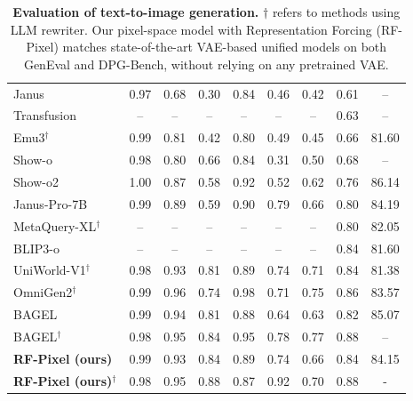 \documentclass{llmxive}
\begin{document}
\begin{table}[t]
\begin{tabular}{l|ccccccc|c}
Janus~\cite{janus}                & 0.97 & 0.68 & 0.30 & 0.84 & 0.46 & 0.42 & 0.61 & -- \\
Transfusion~\cite{transfusion}    & --   & --   & --   & --   & --   & --   & 0.63 & -- \\
Emu3$^\dagger$~\cite{emu3}        & 0.99 & 0.81 & 0.42 & 0.80 & 0.49 & 0.45 & 0.66 & 81.60 \\
Show-o~\cite{showo}               & 0.98 & 0.80 & 0.66 & 0.84 & 0.31 & 0.50 & 0.68 & -- \\
Show-o2~\cite{showo2}             & 1.00 & 0.87 & 0.58 & 0.92 & 0.52 & 0.62 & 0.76 & 86.14 \\
Janus-Pro-7B~\cite{janus-pro}     & 0.99 & 0.89 & 0.59 & 0.90 & 0.79 & 0.66 & 0.80 & 84.19 \\
MetaQuery-XL$^\dagger$~\cite{metaquery} & -- & -- & -- & -- & -- & -- & 0.80 & 82.05 \\
BLIP3-o~\cite{blip3o}             & --   & --   & --   & --   & --   & --   & 0.84 & 81.60 \\
UniWorld-V1$^\dagger$~\cite{uniworld} & 0.98 & 0.93 & 0.81 & 0.89 & 0.74 & 0.71 & 0.84 & 81.38 \\
OmniGen2$^\dagger$~\cite{omnigen2} & 0.99 & 0.96 & 0.74 & 0.98 & 0.71 & 0.75 & 0.86 & 83.57 \\
BAGEL~\cite{bagel}                & 0.99 & 0.94 & 0.81 & 0.88 & 0.64 & 0.63 & 0.82 & 85.07 \\
BAGEL$^\dagger$~\cite{bagel}      & 0.98 & 0.95 & 0.84 & 0.95 & 0.78 & 0.77 & 0.88 & -- \\
\midrule
\rowcolor{gray!10}\textbf{RF-Pixel (ours)} & 0.99 & 0.93 & 0.84 & 0.89 & 0.74 & 0.66 & 0.84 & 84.15 \\
\rowcolor{gray!10}\textbf{RF-Pixel (ours)}$^\dagger$ & 0.98 & 0.95 & 0.88 & 0.87 & 0.92 & 0.70 & 0.88 &-  \\
\bottomrule
\end{tabular}
\caption{\textbf{Evaluation of text-to-image generation.} $\dagger$ refers to methods using LLM rewriter. Our pixel-space model with Representation Forcing (RF-Pixel) matches state-of-the-art VAE-based unified models on both GenEval and DPG-Bench, without relying on any pretrained VAE.}
\label{tab:geneval}
\end{table}
\end{document}
